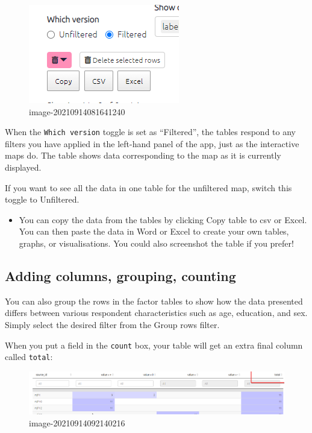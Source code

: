 \documentclass[
]{book}
\providecommand{\tightlist}{%
  \setlength{\itemsep}{0pt}\setlength{\parskip}{0pt}}
\begin{document}
\begin{figure}
\centering
\includegraphics{_assets/image-20210914081641240.png}
\caption{image-20210914081641240}
\end{figure}

When the \texttt{Which\ version} toggle is set as ``Filtered'', the tables respond to any filters you have applied in the left-hand panel of the app, just as the interactive maps do. The table shows data corresponding to the map as it is currently displayed.

If you want to see all the data in one table for the unfiltered map, switch this toggle to Unfiltered.

\begin{itemize}
\tightlist
\item
  You can copy the data from the tables by clicking Copy table to csv or Excel. You can then paste the data in Word or Excel to create your own tables, graphs, or visualisations. You could also screenshot the table if you prefer!
\end{itemize}

\hypertarget{adding-columns-grouping-counting}{%
\subsection{Adding columns, grouping, counting}\label{adding-columns-grouping-counting}}

You can also group the rows in the factor tables to show how the data presented differs between various respondent characteristics such as age, education, and sex. Simply select the desired filter from the Group rows filter.

When you put a field in the \texttt{count} box, your table will get an extra final column called \texttt{total}:

\begin{figure}
\centering
\includegraphics{_assets/image-20210914092140216.png}
\caption{image-20210914092140216}
\end{figure}
\end{document}
